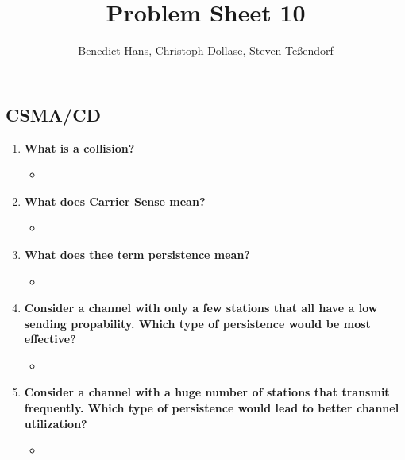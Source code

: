 \documentclass[a4paper,12pt]{article}
\author{Benedict Hans, Christoph Dollase, Steven Te\ss endorf}
\title{ \textbf{Problem Sheet 10}}
\begin{document}
	 
	\maketitle	 %
	
	\subsection{CSMA/CD}
	\begin{enumerate}[label=(\roman*),itemsep=0pt]
		\item \textbf{What is a collision?}
		\begin{itemize}[itemsep=0pt]
			\item 
		\end{itemize}
		\item \textbf{What does Carrier Sense mean?}
		\begin{itemize}[itemsep=0pt]
			\item 
		\end{itemize}
		\item \textbf{What does thee term persistence mean?}
		\begin{itemize}[itemsep=0pt]
			\item 
		\end{itemize}
		\item \textbf{Consider a channel with only a few stations that all have a low sending propability. Which type of persistence would be most effective?}
		\begin{itemize}[itemsep=0pt]
			\item 
		\end{itemize}
		\item \textbf{Consider a channel with a huge number of stations that transmit frequently. Which type of persistence would lead to better channel utilization?}
		\begin{itemize}[itemsep=0pt]
			\item 
		\end{itemize}
	\end{enumerate}
	
\end{document}

